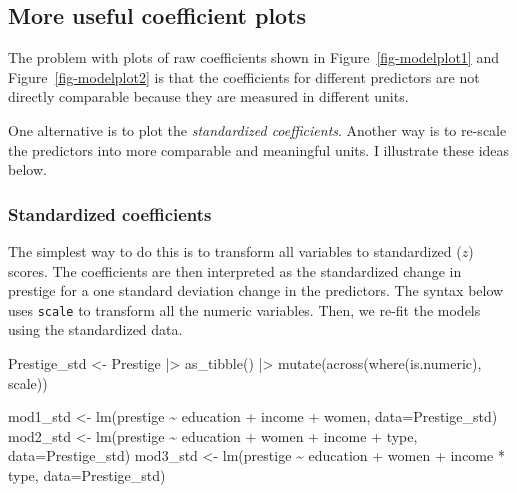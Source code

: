 \documentclass[
  letterpaper,
  10pt,
  krantz2]{krantz}
\makeatletter
\newenvironment{Shaded}{\begin{snugshade}}{\end{snugshade}}
\newcommand{\AttributeTok}[1]{\textcolor[rgb]{0.40,0.45,0.13}{#1}}
\newcommand{\FunctionTok}[1]{\textcolor[rgb]{0.28,0.35,0.67}{#1}}
\newcommand{\NormalTok}[1]{\textcolor[rgb]{0.00,0.23,0.31}{#1}}
\newcommand{\OtherTok}[1]{\textcolor[rgb]{0.00,0.23,0.31}{#1}}
\newcommand{\SpecialCharTok}[1]{\textcolor[rgb]{0.37,0.37,0.37}{#1}}
\newenvironment{kframe}{%
  \medskip{}
  \setlength{\fboxsep}{.8em}
  \def\at@end@of@kframe{}%
  \ifinner\ifhmode%
  \def\at@end@of@kframe{\end{minipage}}%
  \begin{minipage}{\columnwidth}%
  \fi\fi%
  \def\FrameCommand##1{\hskip\@totalleftmargin \hskip-\fboxsep
  \colorbox{shadecolor}{##1}\hskip-\fboxsep
      \hskip-\linewidth \hskip-\@totalleftmargin \hskip\columnwidth}%
  \MakeFramed {\advance\hsize-\width
    \@totalleftmargin\z@ \linewidth\hsize
    \@setminipage}}%
{\par\unskip\endMakeFramed%
  \at@end@of@kframe}
\renewenvironment{Shaded}{\begin{kframe}}{\end{kframe}}
\makeatother
\begin{document}
\subsection{More useful coefficient
plots}\label{more-useful-coefficient-plots}

The problem with plots of raw coefficients shown in
Figure~\ref{fig-modelplot1} and Figure~\ref{fig-modelplot2} is that the
coefficients for different predictors are not directly comparable
because they are measured in different units.

One alternative is to plot the \emph{standardized coefficients}. Another
way is to re-scale the predictors into more comparable and meaningful
units. I illustrate these ideas below.

\subsubsection*{Standardized
coefficients}\label{standardized-coefficients}

The simplest way to do this is to transform all variables to
standardized (\(z\)) scores. The coefficients are then interpreted as
the standardized change in prestige for a one standard deviation change
in the predictors. The syntax below uses \texttt{scale} to transform all
the numeric variables. Then, we re-fit the models using the standardized
data.

\begin{Shaded}
\begin{Highlighting}[]
\NormalTok{Prestige\_std }\OtherTok{\textless{}{-}}\NormalTok{ Prestige }\SpecialCharTok{|\textgreater{}}
  \FunctionTok{as\_tibble}\NormalTok{() }\SpecialCharTok{|\textgreater{}}
  \FunctionTok{mutate}\NormalTok{(}\FunctionTok{across}\NormalTok{(}\FunctionTok{where}\NormalTok{(is.numeric), scale))}

\NormalTok{mod1\_std }\OtherTok{\textless{}{-}} \FunctionTok{lm}\NormalTok{(prestige }\SpecialCharTok{\textasciitilde{}}\NormalTok{ education }\SpecialCharTok{+}\NormalTok{ income }\SpecialCharTok{+}\NormalTok{ women, }
               \AttributeTok{data=}\NormalTok{Prestige\_std)}
\NormalTok{mod2\_std }\OtherTok{\textless{}{-}} \FunctionTok{lm}\NormalTok{(prestige }\SpecialCharTok{\textasciitilde{}}\NormalTok{ education }\SpecialCharTok{+}\NormalTok{ women }\SpecialCharTok{+}\NormalTok{ income }\SpecialCharTok{+}\NormalTok{ type, }
               \AttributeTok{data=}\NormalTok{Prestige\_std)}
\NormalTok{mod3\_std }\OtherTok{\textless{}{-}} \FunctionTok{lm}\NormalTok{(prestige }\SpecialCharTok{\textasciitilde{}}\NormalTok{ education }\SpecialCharTok{+}\NormalTok{ women }\SpecialCharTok{+}\NormalTok{ income }\SpecialCharTok{*}\NormalTok{ type, }
               \AttributeTok{data=}\NormalTok{Prestige\_std)}
\end{Highlighting}
\end{Shaded}
\end{document}
